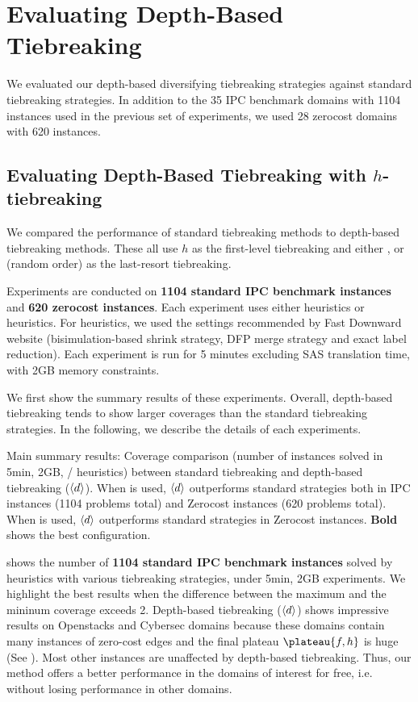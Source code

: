 \section{Evaluating Depth-Based Tiebreaking}
\label{sec:depth-based-evaluation}
We evaluated our depth-based diversifying tiebreaking strategies against standard
tiebreaking strategies.
In addition to the 35 IPC benchmark domains with 1104 instances used in
the previous set of experiments, we used 28 zerocost domains with 620
instances.

\subsection{Evaluating Depth-Based Tiebreaking with $h$-tiebreaking}

We compared the performance of standard tiebreaking methods to
depth-based tiebreaking methods. These all use $h$ as the first-level
tiebreaking and either \fifo, \lifo or \ro (random order) as the
last-resort tiebreaking.

Experiments are conducted on \textbf{1104 standard IPC benchmark
instances} and \textbf{620 zerocost instances}.  Each experiment uses
either \lmcut heuristics or \mands heuristics.  For \mands heuristics,
we used the settings recommended by Fast Downward website
(bisimulation-based shrink strategy, DFP merge strategy and exact label
reduction). Each experiment is run for 5 minutes excluding SAS
translation time, with 2GB memory constraints.

We first show the summary results of these experiments.
Overall, depth-based tiebreaking tends to show larger coverages than the
standard tiebreaking strategies. In the following, we describe the
details of each experiments.

\begin{table}[htb]
 {
 \centering
 \setlength{\tabcolsep}{3pt}
 
 \caption{
 Main summary results: Coverage comparison (number of instances solved in 5min, 2GB, \lmcut/\mands
 heuristics) between standard tiebreaking and depth-based tiebreaking
 (${\left<d\right>}$). When \lmcut is used, ${\left<d\right>}$ outperforms standard strategies both in IPC
 instances (1104 problems total) and Zerocost instances (620 problems
 total). When \mands is used, ${\left<d\right>}$ outperforms standard strategies
 in Zerocost instances. \textbf{Bold} shows the best configuration.}
 \label{tbl:lmcut-ipc-full}
 }
\end{table}

 shows the number of \textbf{1104 standard
IPC benchmark instances} solved by \lmcut heuristics with various
tiebreaking strategies, under 5min, 2GB experiments. We highlight the
best results when the difference between the maximum and the mininum
coverage exceeds 2.  Depth-based tiebreaking (${\left<d\right>}$) shows
impressive results on Openstacks and Cybersec domains because these
domains contain many instances of zero-cost edges and the final plateau
$\plateau{f,h}$ is huge (See ).  Most other instances
are unaffected by depth-based tiebreaking.  Thus, our method offers a
better performance in the domains of interest for free, i.e. without
losing performance in other domains.

